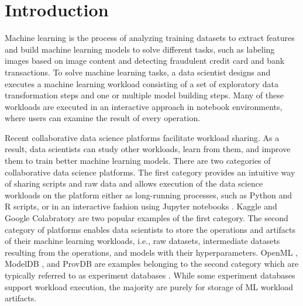 \section{Introduction} \label{sec-introduction}
Machine learning is the process of analyzing training datasets to extract features and build machine learning models to solve different tasks, such as labeling images based on image content and detecting fraudulent credit card and bank transactions.
To solve machine learning tasks, a data scientist designs and executes a machine learning workload consisting of a set of exploratory data transformation steps and one or multiple model building steps.
Many of these workloads are executed in an interactive approach in notebook environments, where users can examine the result of every operation.

Recent collaborative data science platforms facilitate workload sharing.
As a result, data scientists can study other workloads, learn from them, and improve them to train better machine learning models.
There are two categories of collaborative data science platforms.
The first category provides an intuitive way of sharing scripts and raw data and allows execution of the data science workloads on the platform either as long-running processes, such as Python and R scripts, or in an interactive fashion using Jupyter notebooks \cite{Kluyver:2016aa}.
Kaggle \cite{kagglewebsite} and Google Colabratory \cite{googlecolab} are two popular examples of the first category.
The second category of platforms enables data scientists to store the operations and artifacts of their machine learning workloads, i.e., raw datasets, intermediate datasets resulting from the operations, and models with their hyperparameters.
OpenML \cite{vanschoren2014openml}, ModelDB \cite{vartak2016m}, and ProvDB \cite{miao2018provdb} are examples belonging to the second category which are typically referred to as experiment databases \cite{Vanschoren2012}.
While some experiment databases support workload execution, the majority are purely for storage of ML workload artifacts.

